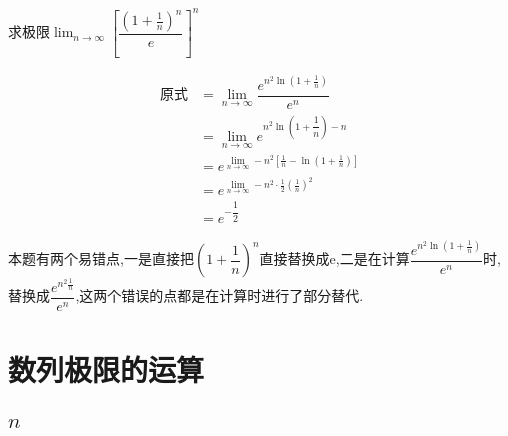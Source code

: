\documentclass[8pt a4paper, oneside, UTF8]{ctexbook}
\begin{document}
\begin{sloppypar}
        \begin{problem}
            求极限$\lim_{n\to\infty}\left[\dfrac{\left(1+\frac1n\right)^n}e\right]^n$        
        \end{problem}
        \begin{solution}
            \begin{align*}
                \text{原式} & = \lim_{n\to \infty} \dfrac{e^{n^2\ln(1+\frac{1}{n})}}{e^n}\\
                & = \lim_{n\to \infty} e^{n^2\ln(1+\dfrac{1}{n})-n}\\
                & = e^{\lim_{n\to\infty}-n^2{\left[\frac1n-\ln(1+\frac1n)\right]}}\\
                & = e^{\lim_{n\to\infty}-n^2\cdot\frac12(\frac1n)^2}\\
                & =e^{-\dfrac{1}{2}}
            \end{align*}   
        \end{solution}
        \begin{note}
            本题有两个易错点,一是直接把$(1+\dfrac{1}{n})^n$直接替换成e,二是在计算$\dfrac{e^{n^2\ln(1+\frac{1}{n})}}{e^n}$时,替换成$\dfrac{e^{n^2\frac{1}{n}}}{e^n}$,这两个错误的点都是在计算时进行了部分替代.
        \end{note}
    \section{数列极限的运算}
    \subsection{\texorpdfstring{$n$}}

\end{sloppypar}
\end{document}
